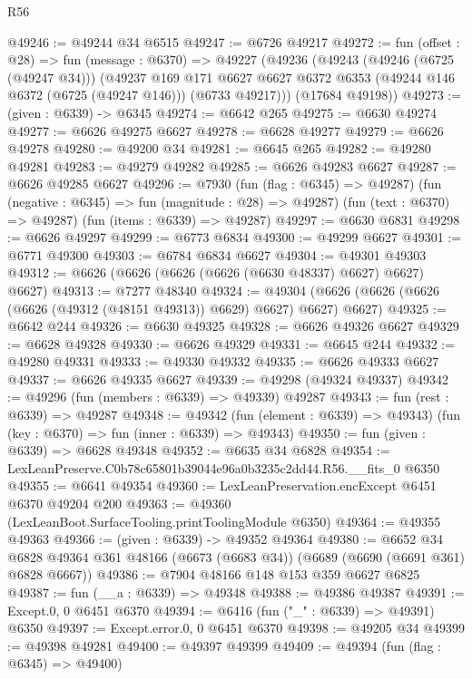 \begin{lexlean}{R56}
\begin{coremodule}
@49246 := @49244 @34 @6515
@49247 := @6726 @49217
@49272 := fun (offset : @28) =>
  fun (message : @6370) =>
  @49227
    (@49236
      (@49243
        (@49246 (@6725 (@49247 @34)))
        (@49237
          @169
          @171
          @6627
          @6627
          @6372
          @6353
          (@49244 @146 @6372 (@6725 (@49247 @146)))
          (@6733 @49217)))
      (@17684 @49198))
@49273 := (given : @6339) -> @6345
@49274 := @6642 @265
@49275 := @6630 @49274
@49277 := @6626 @49275 @6627
@49278 := @6628 @49277
@49279 := @6626 @49278
@49280 := @49200 @34
@49281 := @6645 @265
@49282 := @49280 @49281
@49283 := @49279 @49282
@49285 := @6626 @49283 @6627
@49287 := @6626 @49285 @6627
@49296 := @7930
    (fun (flag : @6345) => @49287)
    (fun (negative : @6345) => fun (magnitude : @28) => @49287)
    (fun (text : @6370) => @49287)
    (fun (items : @6339) => @49287)
@49297 := @6630 @6831
@49298 := @6626 @49297
@49299 := @6773 @6834
@49300 := @49299 @6627
@49301 := @6771 @49300
@49303 := @6784 @6834 @6627
@49304 := @49301 @49303
@49312 := @6626 (@6626 (@6626 (@6626 (@6630 @48337) @6627) @6627) @6627)
@49313 := @7277 @48340
@49324 := @49304 (@6626 (@6626 (@6626 (@6626 (@49312 (@48151 @49313)) @6629) @6627) @6627) @6627)
@49325 := @6642 @244
@49326 := @6630 @49325
@49328 := @6626 @49326 @6627
@49329 := @6628 @49328
@49330 := @6626 @49329
@49331 := @6645 @244
@49332 := @49280 @49331
@49333 := @49330 @49332
@49335 := @6626 @49333 @6627
@49337 := @6626 @49335 @6627
@49339 := @49298 (@49324 @49337)
@49342 := @49296 (fun (members : @6339) => @49339) @49287
@49343 := fun (rest : @6339) => @49287
@49348 := @49342
    (fun (element : @6339) => @49343)
    (fun (key : @6370) => fun (inner : @6339) => @49343)
@49350 := fun (given : @6339) => @6628 @49348
@49352 := @6635 @34 @6828
@49354 := LexLeanPreserve.C0b78c65801b39044e96a0b3235c2dd44.R56.__fits_0 @6350
@49355 := @6641 @49354
@49360 := LexLeanPreservation.encExcept @6451 @6370 @49204 @200
@49363 := @49360 (LexLeanBoot.SurfaceTooling.printToolingModule @6350)
@49364 := @49355 @49363
@49366 := (given : @6339) -> @49352 @49364
@49380 := @6652
    @34
    @6828
    @49364
    @361
    @48166
    (@6673 (@6683 @34))
    (@6689 (@6690 (@6691 @361) @6828 @6667))
@49386 := @7904 @48166 @148 @153 @359 @6627 @6825
@49387 := fun (__a : @6339) => @49348
@49388 := @49386 @49387
@49391 := Except.{0, 0} @6451 @6370
@49394 := @6416 (fun ("_" : @6339) => @49391) @6350
@49397 := Except.error.{0, 0} @6451 @6370
@49398 := @49205 @34
@49399 := @49398 @49281
@49400 := @49397 @49399
@49409 := @49394
    (fun (flag : @6345) => @49400)

\end{coremodule}
\end{lexlean}

